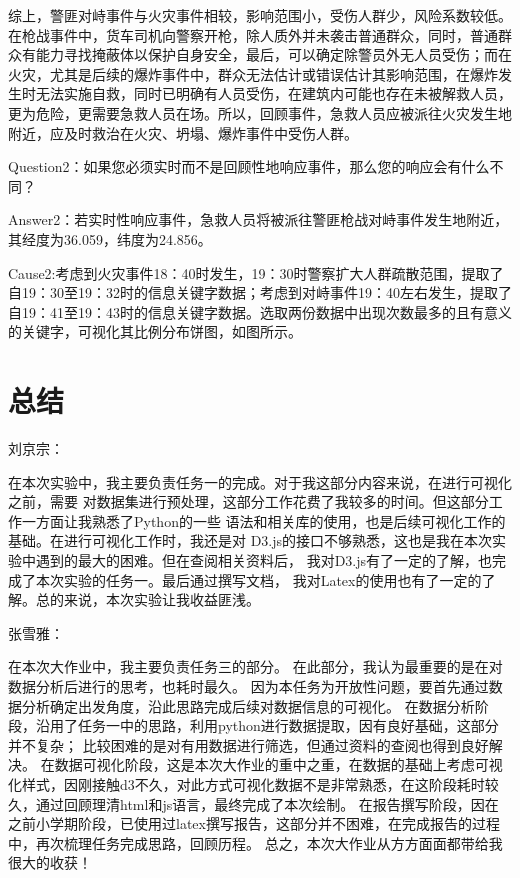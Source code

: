 \documentclass[a4paper]{article}
\begin{document}
综上，警匪对峙事件与火灾事件相较，影响范围小，受伤人群少，风险系数较低。在枪战事件中，货车司机向警察开枪，除人质外并未袭击普通群众，同时，普通群众有能力寻找掩蔽体以保护自身安全，最后，可以确定除警员外无人员受伤；而在火灾，尤其是后续的爆炸事件中，群众无法估计或错误估计其影响范围，在爆炸发生时无法实施自救，同时已明确有人员受伤，在建筑内可能也存在未被解救人员，更为危险，更需要急救人员在场。所以，回顾事件，急救人员应被派往火灾发生地附近，应及时救治在火灾、坍塌、爆炸事件中受伤人群。

Question2：如果您必须实时而不是回顾性地响应事件，那么您的响应会有什么不同？

Answer2：若实时性响应事件，急救人员将被派往警匪枪战对峙事件发生地附近，其经度为36.059，纬度为24.856。

Cause2:考虑到火灾事件18：40时发生，19：30时警察扩大人群疏散范围，提取了自19：30至19：32时的信息关键字数据；考虑到对峙事件19：40左右发生，提取了自19：41至19：43时的信息关键字数据。选取两份数据中出现次数最多的且有意义的关键字，可视化其比例分布饼图，如图所示。

\section{总结}
刘京宗：

在本次实验中，我主要负责任务一的完成。对于我这部分内容来说，在进行可视化之前，需要
对数据集进行预处理，这部分工作花费了我较多的时间。但这部分工作一方面让我熟悉了Python的一些
语法和相关库的使用，也是后续可视化工作的基础。在进行可视化工作时，我还是对
D3.js的接口不够熟悉，这也是我在本次实验中遇到的最大的困难。但在查阅相关资料后，
我对D3.js有了一定的了解，也完成了本次实验的任务一。最后通过撰写文档，
我对Latex的使用也有了一定的了解。总的来说，本次实验让我收益匪浅。

张雪雅：

在本次大作业中，我主要负责任务三的部分。
在此部分，我认为最重要的是在对数据分析后进行的思考，也耗时最久。
因为本任务为开放性问题，要首先通过数据分析确定出发角度，沿此思路完成后续对数据信息的可视化。
在数据分析阶段，沿用了任务一中的思路，利用python进行数据提取，因有良好基础，这部分并不复杂；
比较困难的是对有用数据进行筛选，但通过资料的查阅也得到良好解决。
在数据可视化阶段，这是本次大作业的重中之重，在数据的基础上考虑可视化样式，因刚接触d3不久，对此方式可视化数据不是非常熟悉，在这阶段耗时较久，通过回顾理清html和js语言，最终完成了本次绘制。
在报告撰写阶段，因在之前小学期阶段，已使用过latex撰写报告，这部分并不困难，在完成报告的过程中，再次梳理任务完成思路，回顾历程。
总之，本次大作业从方方面面都带给我很大的收获！
\newpage

\end{document}
